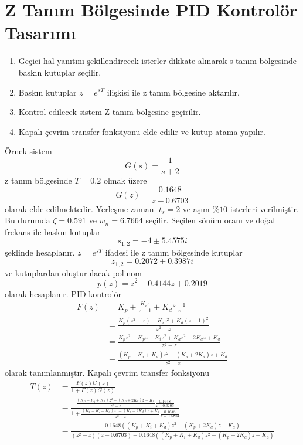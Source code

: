 \chapter{Z Tanım Bölgesinde PID Kontrolör Tasarımı}
\begin{enumerate}
    \item Geçici hal yanıtını şekillendirecek isterler dikkate alınarak s tanım bölgesinde baskın kutuplar seçilir. 
    \item Baskın kutuplar $z=e^{sT}$ ilişkisi ile z tanım bölgesine aktarılır. 
    \item Kontrol edilecek sistem Z tanım bölgesine geçirilir. 
    \item Kapalı çevrim transfer fonksiyonu elde edilir ve kutup atama yapılır.
\end{enumerate}
Örnek sistem
\begin{equation}
    G(s)=\frac{1}{s+2}
\end{equation}
z tanım bölgesinde $T=0.2$ olmak üzere
\begin{equation}
    G(z)=\frac{0.1648}{z-0.6703}
\end{equation}
olarak elde edilmektedir. Yerleşme zamanı $t_s=2$ ve aşım $\%10$ isterleri verilmiştir. Bu durumda $\zeta=0.591$ ve $w_n=6.7664$ seçilir. Seçilen sönüm oranı ve doğal frekans ile baskın kutuplar
\begin{equation}
    s_{1,2}=-4 \pm 5.4575i
\end{equation}
şeklinde hesaplanır. $z=e^{sT}$ ifadesi ile z tanım bölgesinde kutuplar
\begin{equation}
    z_{1,2}=0.2072 \pm 0.3987i
\end{equation}
ve kutuplardan oluşturulacak polinom
\begin{equation}
    p(z)=z^2-0.4144 z+0.2019
\end{equation}
olarak hesaplanır. PID kontrolör
\begin{equation}
\begin{split}
    F(z)&=K_p+\frac{K_iz}{z-1}+K_d\frac{z-1}{z}\\
    &=\frac{K_p(z^2-z)+K_iz^2+K_d(z-1)^2}{z^2-z}\\
    &=\frac{K_pz^2-K_pz+K_iz^2+K_dz^2-2K_dz+K_d}{z^2-z}\\
    &=\frac{(K_p+K_i+K_d)z^2-(K_p+2K_d)z+K_d}{z^2-z}
\end{split}
\end{equation}
olarak tanımlanmıştır. Kapalı çevrim transfer fonksiyonu
\begin{equation}
    \begin{split}
        T(z)&=\frac{F(z)G(z)}{1+F(z)G(z)}\\
        &=\frac{\frac{(K_p+K_i+K_d)z^2-(K_p+2K_d)z+K_d}{z^2-z}\frac{0.1648}{z-0.6703}}{1+\frac{(K_p+K_i+K_d)z^2-(K_p+2K_d)z+K_d}{z^2-z}\frac{0.1648}{z-0.6703}}\\
        &=\frac{0.1648((K_p+K_i+K_d)z^2-(K_p+2K_d)z+K_d)}{(z^2-z)(z-0.6703)+0.1648((K_p+K_i+K_d)z^2-(K_p+2K_d)z+K_d)}
    \end{split}
\end{equation}
